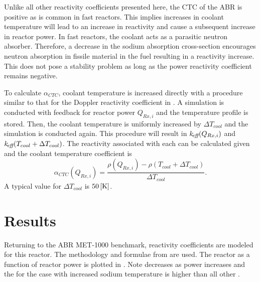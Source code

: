     Unlike all other reactivity coefficients presented here, the CTC of the ABR 
    is positive as is common in fast reactors. This implies increases in coolant 
    temperature will lead to an increase in reactivity and cause a subsequent 
    increase in reactor power. In fast reactors, the coolant acts as a parasitic 
    neutron absorber. Therefore, a decrease in the sodium absorption 
    cross-section encourages neutron absorption in fissile material in the fuel 
    resulting in a reactivity increase. This does not pose a stability problem 
    as long as the power reactivity coefficient remains negative.

    To calculate $\alpha_{CTC}$, coolant temperature is increased directly with
    a procedure similar to that for the Doppler reactivity coefficient in
    . A simulation is 
    conducted with feedback for reactor power $Q_{Rx,i}$ and the temperature 
    profile is stored. Then, the coolant temperature is uniformly
    increased by $\Delta T_{cool}$ and the simulation is conducted again. This
    procedure will result in $k_{\!\mbox{\scriptsize \em eff}}(Q_{Rx,i})$ and 
    ${k_{\!\mbox{\scriptsize \em eff}}(T_{cool} + \Delta T_{cool})}$. The reactivity associated with each
    \keff can be calculated given  and the coolant
    temperature coefficient is
    \begin{equation}
      \label{eq:coolant_temperature_reactivity_coefficient}
      \alpha_{CTC}(Q_{Rx,i}) = \frac{\rho(Q_{Rx,i}) - \rho(T_{cool} + 
        \Delta T_{cool})} {\Delta T_{cool}}.
    \end{equation}
    A typical value for $\Delta T_{cool}$ is $50 \left[\text{{K}}\right]$.

\section{Results}
\label{sec:results}
  Returning to the ABR MET-1000 benchmark, reactivity coefficients are modeled
  for this reactor. The methodology and formulae from
   are used. The reactor \keff as a function
  of reactor power is plotted in . Note \keff decreases
  as power increases and the \keff for the case with increased sodium
  temperature is higher than all other \keff.
  
